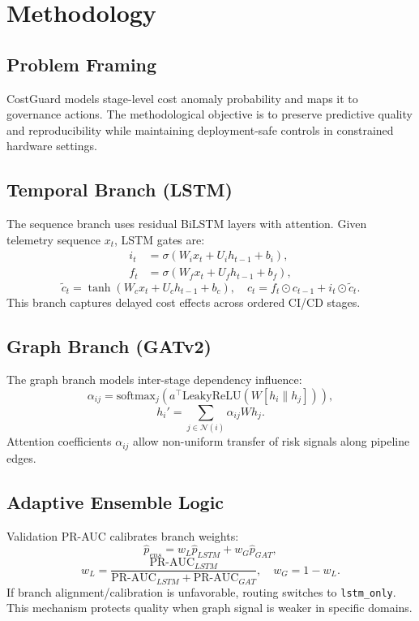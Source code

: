 \documentclass[10pt,twocolumn]{article}
\begin{document}
\FloatBarrier
\section{Methodology}
\subsection{Problem Framing}
CostGuard models stage-level cost anomaly probability and maps it to governance actions. The methodological objective is to preserve predictive quality and reproducibility while maintaining deployment-safe controls in constrained hardware settings.

\subsection{Temporal Branch (LSTM)}
The sequence branch uses residual BiLSTM layers with attention. Given telemetry sequence \(x_t\), LSTM gates are:
\begin{equation}
\begin{aligned}
i_t &= \sigma(W_i x_t + U_i h_{t-1} + b_i),\\
f_t &= \sigma(W_f x_t + U_f h_{t-1} + b_f),
\end{aligned}
\end{equation}
\begin{equation}
\tilde{c}_t=\tanh(W_c x_t + U_c h_{t-1}+b_c),\quad
c_t=f_t \odot c_{t-1}+i_t \odot \tilde{c}_t.
\end{equation}
This branch captures delayed cost effects across ordered CI/CD stages.

\subsection{Graph Branch (GATv2)}
The graph branch models inter-stage dependency influence:
\begin{equation}
\alpha_{ij}=\mathrm{softmax}_j\!\left(a^\top\mathrm{LeakyReLU}(W[h_i \| h_j])\right),
\end{equation}
\begin{equation}
h_i'=\sum_{j\in\mathcal{N}(i)} \alpha_{ij}Wh_j.
\end{equation}
Attention coefficients \(\alpha_{ij}\) allow non-uniform transfer of risk signals along pipeline edges.

\subsection{Adaptive Ensemble Logic}
Validation PR-AUC calibrates branch weights:
\begin{equation}
\hat{p}_{ens}=w_L\hat{p}_{LSTM}+w_G\hat{p}_{GAT},
\end{equation}
\begin{equation}
w_L=\frac{\mathrm{PR\text{-}AUC}_{LSTM}}{\mathrm{PR\text{-}AUC}_{LSTM}+\mathrm{PR\text{-}AUC}_{GAT}},\quad
w_G=1-w_L.
\end{equation}
If branch alignment/calibration is unfavorable, routing switches to \texttt{lstm\_only}. This mechanism protects quality when graph signal is weaker in specific domains.
\end{document}
